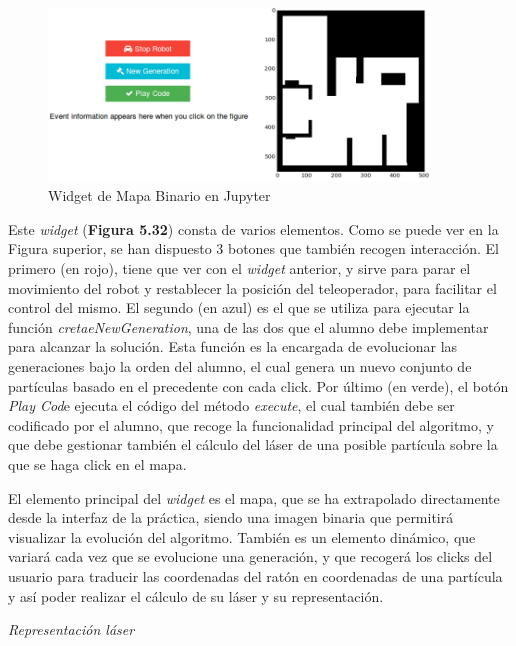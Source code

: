 \begin{figure}[H]
	\begin{center}
		\includegraphics[width=0.90\textwidth]{figures/mapabinariojupyter.png}
		\caption{Widget de Mapa Binario en Jupyter}
		\label{fig.mapabinariojupyter}
	\end{center}
\end{figure}
Este \textit{widget} (\textbf{Figura 5.32}) consta de varios elementos. Como se puede ver en la Figura superior, se han dispuesto 3 botones que también recogen interacción. El primero (en rojo), tiene que ver con el \textit{widget} anterior, y sirve para parar el movimiento del robot y restablecer la posición del teleoperador, para facilitar el control del mismo. El segundo (en azul) es el que se utiliza para ejecutar la función \textit{cretaeNewGeneration}, una de las dos que el alumno debe implementar para alcanzar la solución. Esta función es la encargada de evolucionar las generaciones bajo la orden del alumno, el cual genera un nuevo conjunto de partículas basado en el precedente con cada click. Por último (en verde), el botón \textit{Play Cod}e ejecuta el código del método \textit{execute}, el cual también debe ser codificado por el alumno, que recoge la funcionalidad principal del algoritmo, y que debe gestionar también el cálculo del láser de una posible partícula sobre la que se haga click en el mapa.

El elemento principal del \textit{widget} es el mapa, que se ha extrapolado directamente desde la interfaz de la práctica, siendo una imagen binaria que permitirá visualizar la evolución del algoritmo. También es un elemento dinámico, que variará cada vez que se evolucione una generación, y que recogerá los clicks del usuario para traducir las coordenadas del ratón en coordenadas de una partícula y así poder realizar el cálculo de su láser y su representación.

\textit{Representación láser}

